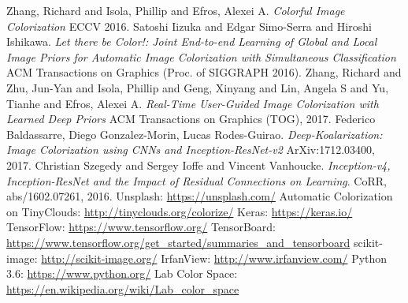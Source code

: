 \documentclass[10pt,twocolumn,letterpaper]{article}
\begin{document}
	\begin{thebibliography}{1}
		 Zhang, Richard and Isola, Phillip and Efros, Alexei A. \textit{Colorful Image Colorization} ECCV 2016.
		 Satoshi Iizuka and Edgar Simo-Serra and Hiroshi Ishikawa. \textit{Let there be Color!: Joint End-to-end Learning of Global and Local Image Priors for Automatic Image Colorization with Simultaneous Classification} ACM Transactions on Graphics (Proc. of SIGGRAPH 2016).
		 Zhang, Richard and Zhu, Jun-Yan and Isola, Phillip and Geng, Xinyang and Lin, Angela S and Yu, Tianhe and Efros, Alexei A. \textit{Real-Time User-Guided Image Colorization with Learned Deep Priors} ACM Transactions on Graphics (TOG), 2017.
		 Federico Baldassarre, Diego Gonzalez-Morin, Lucas Rodes-Guirao. \textit{Deep-Koalarization: Image Colorization using CNNs and Inception-ResNet-v2} ArXiv:1712.03400, 2017.
		 Christian Szegedy and Sergey Ioffe and Vincent Vanhoucke. \textit{Inception-v4, Inception-ResNet and the Impact of Residual Connections on Learning}. CoRR, abs/1602.07261, 2016.
		 Unsplash: \url{https://unsplash.com/}
		 Automatic Colorization on TinyClouds: \url{http://tinyclouds.org/colorize/}
		 Keras: \url{https://keras.io/}
		 TensorFlow: \url{https://www.tensorflow.org/}
		 TensorBoard: \url{https://www.tensorflow.org/get_started/summaries_and_tensorboard}
		 scikit-image: \url{http://scikit-image.org/}
		 IrfanView: \url{http://www.irfanview.com/}
		 Python 3.6: \url{https://www.python.org/}
		 Lab Color Space: \url{https://en.wikipedia.org/wiki/Lab_color_space}
	\end{thebibliography}
\end{document}
